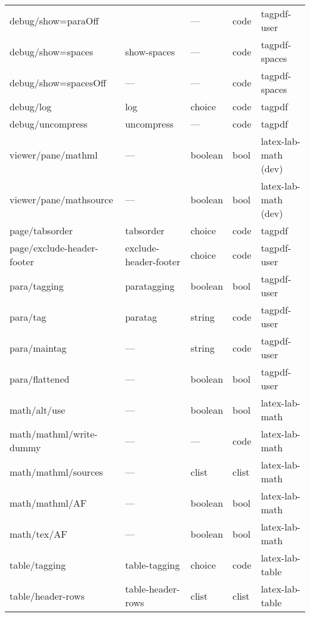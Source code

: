\begin{tabular}{lllll}
debug/show=paraOff&                &    ---           &code  & tagpdf-user\\
debug/show=spaces & show-spaces    &    ---           &code  & tagpdf-spaces\\
debug/show=spacesOff& ---          &    ---           &code  & tagpdf-spaces\\
debug/log        & log             & choice           &code  & tagpdf \\
debug/uncompress & uncompress      &  ---             &code  & tagpdf\\[4pt]\midrule  
viewer/pane/mathml &  ---          &  boolean         &bool  &latex-lab-math (dev)\\
viewer/pane/mathsource& ---        &boolean           &bool  &latex-lab-math (dev)\\[4pt]\midrule
page/tabsorder  &tabsorder         & choice          & code & tagpdf\\   
page/exclude-header-footer & exclude-header-footer &choice & code &tagpdf-user\\[4pt]\midrule
para/tagging     &paratagging      &boolean          &bool  &tagpdf-user\\
para/tag         &paratag          &string           &code  &tagpdf-user\\
para/maintag     &---              &string           &code  &tagpdf-user\\
para/flattened   &---              &boolean          &bool  &tagpdf-user\\[4pt]\midrule
math/alt/use     &---              &boolean          &bool  &latex-lab-math\\
math/mathml/write-dummy & ---      &---              &code  &latex-lab-math\\
math/mathml/sources &---           & clist           &clist &latex-lab-math\\
math/mathml/AF      &---           &boolean          &bool  &latex-lab-math\\
math/tex/AF       & ---            &boolean          &bool  &latex-lab-math\\
table/tagging     & table-tagging  &choice           &code  &latex-lab-table\\
table/header-rows & table-header-rows& clist         &clist &latex-lab-table\\
\end{tabular}
